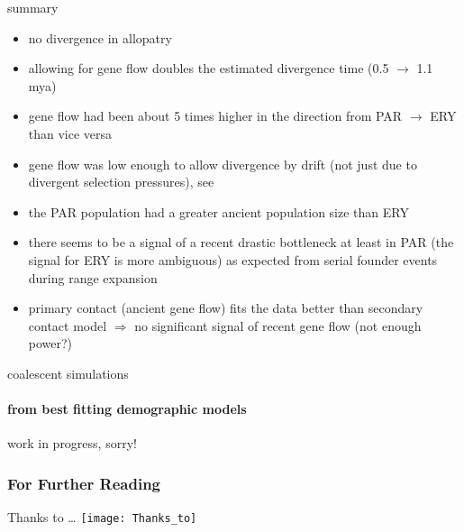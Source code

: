 \documentclass[xcolor=pdftex,dvipsnames,table, handout]{beamer}
\begin{document}
\begin{frame}{summary}
\begin{itemize}
\scriptsize
\item no divergence in allopatry\\[10pt]\pause
\item allowing for gene flow doubles the estimated divergence time (0.5 $\rightarrow$ 1.1 mya)\\[10pt]\pause
\item gene flow had been about 5 times higher in the direction from PAR $\rightarrow$ ERY than vice versa\\[10pt]\pause
\item gene flow was low enough to allow divergence by drift (not just due to divergent selection pressures), see \citealt{Bank2012a}\\[10pt]\pause
\item the PAR population had a greater ancient population size than ERY\\[10pt]\pause
\item there seems to be a signal of a recent drastic bottleneck at least in PAR (the signal for ERY is more ambiguous) as expected from serial founder events during range expansion\\[10pt]\pause
\item primary contact (ancient gene flow) fits the data better than secondary contact model $\Rightarrow$ no significant signal of recent gene flow (not enough power?)\\[10pt]\pause
\end{itemize}
\end{frame}
%



\begin{frame}{coalescent simulations}
\framesubtitle{from best fitting demographic models}
\centering
work in progress, sorry!
\end{frame}
%

\begin{frame}[allowframebreaks] %
\frametitle{For Further Reading}
\scriptsize


\end{frame}

\begin{frame}{Thanks to \ldots}
\centering
\texttt{[image: Thanks\_to]}
\end{frame}

\end{document}
